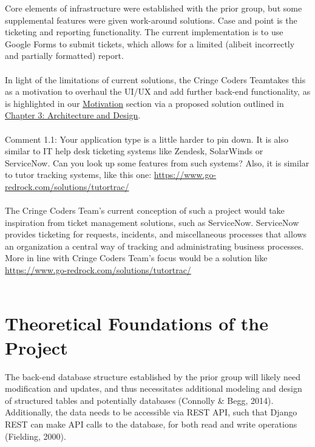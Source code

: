 \documentclass[oneside,openany,obeyspaces]{book}
\newcommand\tab[1][1cm]{\hspace*{#1}}
\newcommand\TeamName{Cringe Coders Team}
\begin{document}
\begin{flushleft}
    \tab Core elements of infrastructure were established with the prior group, but some supplemental features were given work-around solutions. Case and point is the ticketing and reporting functionality. The current implementation is to use Google Forms to submit tickets, which allows for a limited (alibeit incorrectly and partially formatted) report.\\~\\

    \tab In light of the limitations of current solutions, the \TeamName\space takes this as a motivation to overhaul the UI/UX and add further back-end functionality, as is highlighted in our \hyperref[sec:Motivation]{Motivation} section via a proposed solution outlined in \hyperref[chp:Architecture and Design]{Chapter 3: Architecture and Design}.\\~\\
    {\color{red}Comment 1.1: Your application type is a little harder to pin down. It is also similar to IT help desk ticketing systems like Zendesk, SolarWinds or ServiceNow. Can you look up some features from such systems? Also, it is similar to tutor tracking systems, like this one: \url{https://www.go-redrock.com/solutions/tutortrac/}\\~\\}
    {\color{blue} \tab The \TeamName's current conception of such a project would take inspiration from ticket management solutions, such as ServiceNow. ServiceNow provides ticketing for requests, incidents, and miscellaneous processes that allows an organization a central way of tracking and administrating business processes. More in line with \TeamName's focus would be a solution like \url{https://www.go-redrock.com/solutions/tutortrac/}\\~\\}

    \section{Theoretical Foundations of the Project}

    \tab The back-end database structure established by the prior group will likely need modification and updates, and thus necessitates additional modeling and design of structured tables and potentially databases (Connolly \& Begg, 2014). Additionally, the data needs to be accessible via REST API, such that Django REST can make API calls to the database, for both read and write operations (Fielding, 2000).\\~\\


\end{flushleft}
\end{document}
